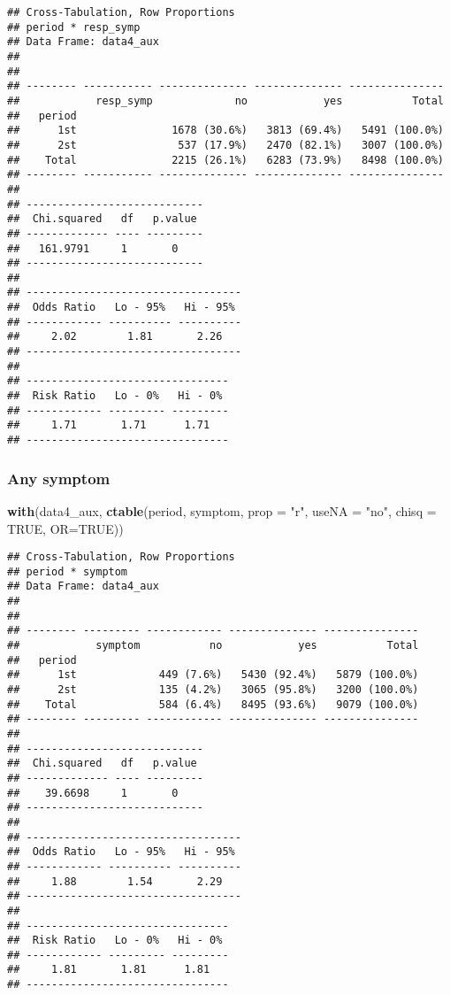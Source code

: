 \documentclass[
]{article}
\newenvironment{Shaded}{\begin{snugshade}}{\end{snugshade}}
\newcommand{\DataTypeTok}[1]{\textcolor[rgb]{0.13,0.29,0.53}{#1}}
\newcommand{\KeywordTok}[1]{\textcolor[rgb]{0.13,0.29,0.53}{\textbf{#1}}}
\newcommand{\NormalTok}[1]{#1}
\newcommand{\OtherTok}[1]{\textcolor[rgb]{0.56,0.35,0.01}{#1}}
\newcommand{\StringTok}[1]{\textcolor[rgb]{0.31,0.60,0.02}{#1}}
\begin{document}
\begin{verbatim}
## Cross-Tabulation, Row Proportions  
## period * resp_symp  
## Data Frame: data4_aux  
## 
## 
## -------- ----------- -------------- -------------- ---------------
##            resp_symp             no            yes           Total
##   period                                                          
##      1st               1678 (30.6%)   3813 (69.4%)   5491 (100.0%)
##      2st                537 (17.9%)   2470 (82.1%)   3007 (100.0%)
##    Total               2215 (26.1%)   6283 (73.9%)   8498 (100.0%)
## -------- ----------- -------------- -------------- ---------------
## 
## ----------------------------
##  Chi.squared   df   p.value 
## ------------- ---- ---------
##   161.9791     1       0    
## ----------------------------
## 
## ----------------------------------
##  Odds Ratio   Lo - 95%   Hi - 95% 
## ------------ ---------- ----------
##     2.02        1.81       2.26   
## ----------------------------------
## 
## --------------------------------
##  Risk Ratio   Lo - 0%   Hi - 0% 
## ------------ --------- ---------
##     1.71       1.71      1.71   
## --------------------------------
\end{verbatim}

\hypertarget{any-symptom-2}{%
\subsubsection{Any symptom}\label{any-symptom-2}}

\begin{Shaded}
\begin{Highlighting}[]
\KeywordTok{with}\NormalTok{(data4_aux, }\KeywordTok{ctable}\NormalTok{(period, symptom, }\DataTypeTok{prop =} \StringTok{"r"}\NormalTok{, }\DataTypeTok{useNA =} \StringTok{"no"}\NormalTok{, }\DataTypeTok{chisq =} \OtherTok{TRUE}\NormalTok{, }\DataTypeTok{OR=}\OtherTok{TRUE}\NormalTok{))}
\end{Highlighting}
\end{Shaded}

\begin{verbatim}
## Cross-Tabulation, Row Proportions  
## period * symptom  
## Data Frame: data4_aux  
## 
## 
## -------- --------- ------------ -------------- ---------------
##            symptom           no            yes           Total
##   period                                                      
##      1st             449 (7.6%)   5430 (92.4%)   5879 (100.0%)
##      2st             135 (4.2%)   3065 (95.8%)   3200 (100.0%)
##    Total             584 (6.4%)   8495 (93.6%)   9079 (100.0%)
## -------- --------- ------------ -------------- ---------------
## 
## ----------------------------
##  Chi.squared   df   p.value 
## ------------- ---- ---------
##    39.6698     1       0    
## ----------------------------
## 
## ----------------------------------
##  Odds Ratio   Lo - 95%   Hi - 95% 
## ------------ ---------- ----------
##     1.88        1.54       2.29   
## ----------------------------------
## 
## --------------------------------
##  Risk Ratio   Lo - 0%   Hi - 0% 
## ------------ --------- ---------
##     1.81       1.81      1.81   
## --------------------------------
\end{verbatim}
\end{document}
